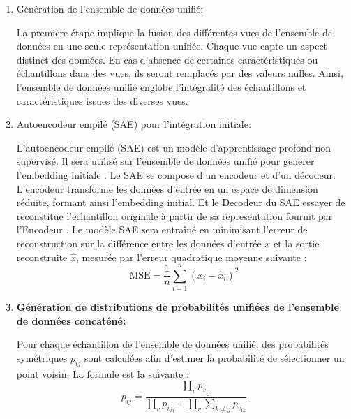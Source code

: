             \begin{enumerate}
                \item{Génération de l'ensemble de données unifié:}
                
                    La première étape implique la fusion des différentes vues de l'ensemble de données en une seule représentation unifiée. Chaque vue capte un aspect distinct des données. En cas d'absence de certaines caractéristiques ou échantillons dans des vues, ils seront  remplacés par des valeurs nulles. Ainsi, l'ensemble de données unifié englobe l'intégralité des échantillons et caractéristiques issues des diverses vues.
                    
                \item{Autoencodeur empilé (SAE) pour l'intégration initiale:}
                
                    L'autoencodeur empilé (SAE) est un modèle d'apprentissage profond non supervisé. Il sera  utilisé sur l'ensemble de données unifié pour generer l'embedding initiale . Le SAE se compose d'un encodeur et d'un décodeur. L'encodeur transforme les données d'entrée en un espace de dimension réduite, formant ainsi l'embedding initial. Et le Decodeur du SAE essayer de reconstitue l'echantillon originale à partir de sa representation fournit par l'Encodeur . Le modèle SAE sera  entraîné en minimisant l'erreur de reconstruction sur la différence entre les données d'entrée \(x\) et la sortie reconstruite \(\hat{x}\), mesurée par l'erreur quadratique moyenne suivante :
                    \begin{equation}
                      \text{MSE} = \frac{1}{n}\sum_{i=1}^{n}(x_i - \hat{x}_i)^2
                    \end{equation}
                \item\textbf{Génération de distributions de probabilités unifiées de l'ensemble de données concaténé:}
       
                    Pour chaque échantillon de l'ensemble de données unifié, des probabilités symétriques \( p_{ij} \) sont calculées afin d'estimer la probabilité de sélectionner un point voisin. La formule est la suivante :
                     \begin{equation}
                           p_{ij} = \frac{\prod_v p_{v_{ij}}}{\prod_v p_{v_{ij}} + \prod_v \sum_{k \neq j} p_{v_{ik}}}
                    \end{equation}
        

\end{enumerate}
